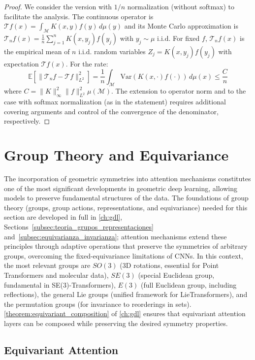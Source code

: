 \begin{proof}
We consider the version with $1/n$ normalization (without softmax) to facilitate the analysis. The continuous operator is $\mathcal{T}f(x) = \int_\mathcal{M} K(x,y) f(y)\, d\mu(y)$ and its Monte Carlo approximation is $\mathcal{T}_n f(x) = \frac{1}{n}\sum_{j=1}^n K(x, y_j) f(y_j)$ with $y_j \sim \mu$ i.i.d. For fixed $f$, $\mathcal{T}_n f(x)$ is the empirical mean of $n$ i.i.d. random variables $Z_j = K(x, y_j)f(y_j)$ with expectation $\mathcal{T}f(x)$. For the rate:
\[
\mathbb{E}[\|\mathcal{T}_n f - \mathcal{T}f\|_{L^2}^2] = \frac{1}{n}\int_\mathcal{M} \text{Var}(K(x,\cdot)f(\cdot))\, d\mu(x) \leq \frac{C}{n}
\]
where $C = \|K\|_\infty^2 \|f\|_{L^2}^2 \mu(\mathcal{M})$. The extension to operator norm and to the case with softmax normalization (as in the statement) requires additional covering arguments and control of the convergence of the denominator, respectively.
\end{proof}

\section{Group Theory and Equivariance}

The incorporation of geometric symmetries into attention mechanisms constitutes one of the most significant developments in geometric deep learning, allowing models to preserve fundamental structures of the data. The foundations of group theory (groups, group actions, representations, and equivariance) needed for this section are developed in full in \autoref{ch:gdl}, Sections~\ref{subsec:teoria_grupos_representaciones} and~\ref{subsec:equivarianza_invarianza}; attention mechanisms extend these principles through adaptive operations that preserve the symmetries of arbitrary groups, overcoming the fixed-equivariance limitations of \glspl{CNN}. In this context, the most relevant groups are $SO(3)$ (3D rotations, essential for Point \glspl{Transformer} and molecular data), $SE(3)$ (special Euclidean group, fundamental in SE(3)-\glspl{Transformer}), $E(3)$ (full Euclidean group, including reflections), the general Lie groups (unified framework for Lie\glspl{Transformer}), and the permutation groups (for invariance to reorderings in sets). \autoref{theorem:equivariant_composition} of \autoref{ch:gdl} ensures that equivariant attention layers can be composed while preserving the desired symmetry properties.

\subsection{Equivariant Attention}\label{subsec:equivariant_attention}\label{sec:equivariant_attention}


